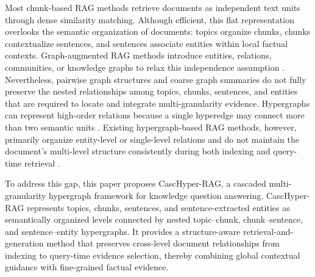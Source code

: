 \documentclass[a4paper,fleqn]{cas-dc}
\begin{document}
Most chunk-based RAG methods retrieve documents as independent text units through dense similarity matching. Although efficient, this flat representation overlooks the semantic organization of documents: topics organize chunks, chunks contextualize sentences, and sentences associate entities within local factual contexts. Graph-augmented RAG methods introduce entities, relations, communities, or knowledge graphs to relax this independence assumption \citep{Peng2025GraphRAGSurvey}. Nevertheless, pairwise graph structures and coarse graph summaries do not fully preserve the nested relationships among topics, chunks, sentences, and entities that are required to locate and integrate multi-granularity evidence. Hypergraphs can represent high-order relations because a single hyperedge may connect more than two semantic units \citep{Feng2019HGNN}. Existing hypergraph-based RAG methods, however, primarily organize entity-level or single-level relations and do not maintain the document's multi-level structure consistently during both indexing and query-time retrieval \citep{Feng2026HyperRAG}.

To address this gap, this paper proposes CascHyper-RAG, a cascaded multi-granularity hypergraph framework for knowledge question answering. CascHyper-RAG represents topics, chunks, sentences, and sentence-extracted entities as semantically organized levels connected by nested topic--chunk, chunk--sentence, and sentence--entity hypergraphs. It provides a structure-aware retrieval-and-generation method that preserves cross-level document relationships from indexing to query-time evidence selection, thereby combining global contextual guidance with fine-grained factual evidence.
\end{document}
